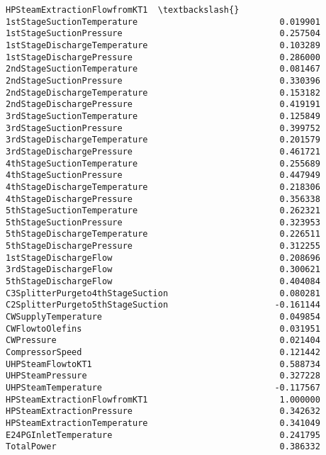 \documentclass[11pt]{article}
\begin{document}
\begin{tcolorbox}[breakable, size=fbox, boxrule=.5pt, pad at break*=1mm, opacityfill=0]
\begin{Verbatim}[commandchars=\\\{\}]
                                  HPSteamExtractionFlowfromKT1  \textbackslash{}
1stStageSuctionTemperature                            0.019901
1stStageSuctionPressure                               0.257504
1stStageDischargeTemperature                          0.103289
1stStageDischargePressure                             0.286000
2ndStageSuctionTemperature                            0.081467
2ndStageSuctionPressure                               0.330396
2ndStageDischargeTemperature                          0.153182
2ndStageDischargePressure                             0.419191
3rdStageSuctionTemperature                            0.125849
3rdStageSuctionPressure                               0.399752
3rdStageDischargeTemperature                          0.201579
3rdStageDischargePressure                             0.461721
4thStageSuctionTemperature                            0.255689
4thStageSuctionPressure                               0.447949
4thStageDischargeTemperature                          0.218306
4thStageDischargePressure                             0.356338
5thStageSuctionTemperature                            0.262321
5thStageSuctionPressure                               0.323953
5thStageDischargeTemperature                          0.226511
5thStageDischargePressure                             0.312255
1stStageDischargeFlow                                 0.208696
3rdStageDischargeFlow                                 0.300621
5thStageDischargeFlow                                 0.404084
C3SplitterPurgeto4thStageSuction                      0.080281
C2SplitterPurgeto5thStageSuction                     -0.161144
CWSupplyTemperature                                   0.049854
CWFlowtoOlefins                                       0.031951
CWPressure                                            0.021404
CompressorSpeed                                       0.121442
UHPSteamFlowtoKT1                                     0.588734
UHPSteamPressure                                      0.327228
UHPSteamTemperature                                  -0.117567
HPSteamExtractionFlowfromKT1                          1.000000
HPSteamExtractionPressure                             0.342632
HPSteamExtractionTemperature                          0.341049
E24PGInletTemperature                                 0.241795
TotalPower                                            0.386332


\end{Verbatim}
\end{tcolorbox}
\end{document}
